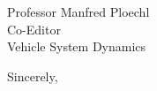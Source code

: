 \documentclass{letter}
\begin{document}
\begin{letter}{Professor Manfred Ploechl\\
Co-Editor\\
Vehicle System Dynamics}
\vspace{2\parskip} %
\closing{Sincerely,}
\vspace{2\parskip} %



\end{letter}
\end{document}
